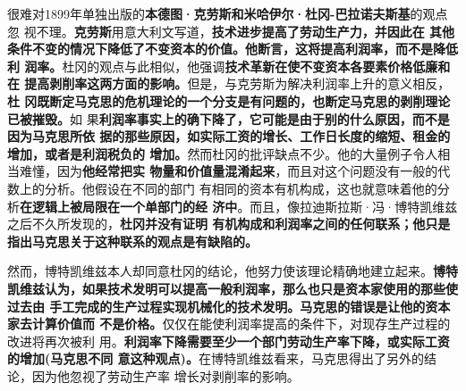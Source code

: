 很难对1899年单独出版的\textbf{本德图·克劳斯和米哈伊尔·杜冈-巴拉诺夫斯基}的观点忽
视不理。\textbf{克劳斯}用意大利文写道，\textbf{技术进步提高了劳动生产力，并因此在
  其他条件不变的情况下降低了不变资本的价值。他断言，这将提高利润率，而不是降低利
  润率。}杜冈的观点与此相似，他强调\textbf{技术革新在使不变资本各要素价格低廉和在
  提高剥削率这两方面的影响。}但是，与克劳斯为解决利润率上升的意义相反，\textbf{杜
  冈既断定马克思的危机理论的一个分支是有问题的，也断定马克思的剥削理论已被摧毁。}如
果\textbf{利润率事实上的确下降了，它可能是由于别的什么原因，而不是因为马克思所依
  据的那些原因，如实际工资的增长、工作日长度的缩短、租金的增加，或者是利润税负的
  增加。}然而杜冈的批评缺点不少。他的大量例子令人相当难懂，因为\textbf{他经常把实
  物量和价值量混淆起来}，而且对这个问题没有一般的代数上的分析。他假设在不同的部门
有相同的资本有机构成，这也就意味着他的分析\textbf{在逻辑上被局限在一个单部门的经
  济中}。而且，像拉迪斯拉斯·冯·博特凯维兹之后不久所发现的，\textbf{杜冈并没有证明
  有机构成和利润率之间的任何联系；他只是指出马克思关于这种联系的观点是有缺陷的。}

然而，博特凯维兹本人却同意杜冈的结论，他努力使该理论精确地建立起来。\textbf{博特
  凯维兹认为，如果技术发明可以提高一般利润率，那么也只是资本家使用的那些使过去由
  手工完成的生产过程实现机械化的技术发明。马克思的错误是让他的资本家去计算价值而
  不是价格。}仅仅在能使利润率提高的条件下，对现存生产过程的改进将再次被利
用。\textbf{利润率下降需要至少一个部门劳动生产率下降，或实际工资的增加(马克思不同
  意这种观点)。}在博特凯维兹看来，马克思得出了另外的结论，因为他忽视了劳动生产率
增长对剥削率的影响。

